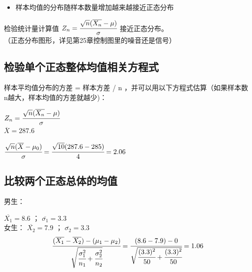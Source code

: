 \begin{itemize}
\tightlist
\item
  样本均值的分布随样本数量增加越来越接近正态分布
\end{itemize}

检验统计量计算值
\(Z_n = \cfrac{ \sqrt{n}(\overline{X_n} - \mu) }{\sigma}\)
接近正态分布。\\

（正态分布图形，详见第25章控制图里的噪音还是信号）

\hypertarget{ux68c0ux9a8cux5355ux4e2aux6b63ux6001ux6574ux4f53ux5747ux503cux76f8ux5173ux65b9ux7a0bux5f0f}{%
\subsection{检验单个正态整体均值相关方程式}\label{ux68c0ux9a8cux5355ux4e2aux6b63ux6001ux6574ux4f53ux5747ux503cux76f8ux5173ux65b9ux7a0bux5f0f}}

样本平均值分布的方差 = 样本方差 / n
，并可以用以下方程式估算（如果样本数n越大，样本均值的方差就越少)：

\(Z_n = \cfrac{ \sqrt{n}(\overline{X_n} - \mu) }{\sigma}\)\\

\(\overline{X} = 287.6\)

\(\cfrac{ \sqrt{n}(\overline{X} - \mu_0) }{\sigma} = \cfrac{ \sqrt{10}( 287.6 - 285 ) }{4} = 2.06\)\\

\hypertarget{ux6bd4ux8f83ux4e24ux4e2aux6b63ux6001ux603bux4f53ux7684ux5747ux503c-1}{%
\subsection{比较两个正态总体的均值}\label{ux6bd4ux8f83ux4e24ux4e2aux6b63ux6001ux603bux4f53ux7684ux5747ux503c-1}}

\begin{description}
\tightlist
\item[]
男生：
\end{description}

\(\overline{X_1} = 8.6\) ； \(\overline{\sigma_1} = 3.3\)\\
女生： \(\overline{X_2} = 7.9\) ； \(\overline{\sigma_2} = 3.3\)\\

\[\cfrac{ (\overline{X_1} - \overline{X_2}) - ({\mu}_1  - {\mu}_2)}{\sqrt{\cfrac{\sigma_1^2}{n_1} + \cfrac{\sigma_2^2}{n_2}}} = \cfrac{ (8.6 - 7.9) - 0 }{\sqrt{\cfrac{(3.3)^2}{50} + \cfrac{(3.3)^2}{50}}} = 1.06\]

